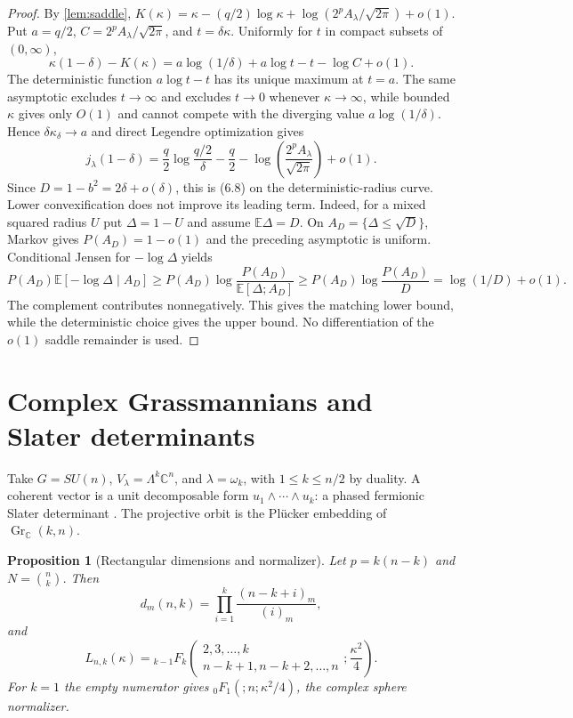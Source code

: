 \documentclass[11pt,a4paper]{article}
\newtheorem{proposition}[theorem]{Proposition}
\newcommand{\E}{\mathbb E}
\newcommand{\C}{\mathbb C}
\DeclareMathOperator{\Gr}{Gr}
\begin{document}
\begin{proof}
By \cref{lem:saddle},
$K(\kappa)=\kappa-(q/2)\log\kappa+
\log(2^pA_\lambda/\sqrt{2\pi})+o(1)$.
Put $a=q/2$, $C=2^pA_\lambda/\sqrt{2\pi}$, and
$t=\delta\kappa$.  Uniformly for $t$ in compact subsets of
$(0,\infty)$,
\[
 \kappa(1-\delta)-K(\kappa)
 =a\log(1/\delta)+a\log t-t-\log C+o(1).
\]
The deterministic function $a\log t-t$ has its unique maximum at $t=a$.
The same asymptotic excludes $t\to\infty$ and excludes $t\to0$ whenever
$\kappa\to\infty$, while bounded $\kappa$ gives only $O(1)$ and cannot
compete with the diverging value $a\log(1/\delta)$.  Hence
$\delta\kappa_\delta\to a$ and direct Legendre optimization gives
\[
 j_\lambda(1-\delta)=
 \frac q2\log\frac{q/2}{\delta}-\frac q2
 -\log\left(\frac{2^pA_\lambda}{\sqrt{2\pi}}\right)+o(1).
\]
Since $D=1-b^2=2\delta+o(\delta)$, this is (6.8) on the
deterministic-radius curve.  Lower convexification does not improve its
leading term.  Indeed, for a mixed squared radius $U$ put
$\Delta=1-U$ and assume $\E\Delta=D$.  On
$A_D=\{\Delta\le\sqrt D\}$, Markov gives
$P(A_D)=1-o(1)$ and the preceding asymptotic is uniform.  Conditional
Jensen for $-\log\Delta$ yields
\[
 P(A_D)\E[-\log\Delta\mid A_D]
 \ge P(A_D)\log\frac{P(A_D)}{\E[\Delta;A_D]}
 \ge P(A_D)\log\frac{P(A_D)}D
 =\log(1/D)+o(1).
\]
The complement contributes nonnegatively.  This gives the matching lower
bound, while the deterministic choice gives the upper bound.  No
differentiation of the $o(1)$ saddle remainder is used.
\end{proof}

\section{Complex Grassmannians and Slater determinants}

Take $G=SU(n)$, $V_\lambda=\Lambda^k\C^n$, and
$\lambda=\omega_k$, with $1\le k\le n/2$ by duality.  A coherent vector is
a unit decomposable form $u_1\wedge\cdots\wedge u_k$: a phased fermionic
Slater determinant \cite{Lowdin1955}.  The projective orbit is the Pl\"ucker
embedding of $\Gr_\C(k,n)$.

\begin{proposition}[Rectangular dimensions and normalizer]\label{prop:slater}
Let $p=k(n-k)$ and $N=\binom nk$.  Then
\[
 d_m(n,k)=\prod_{i=1}^k\frac{(n-k+i)_m}{(i)_m},
 \tag{7.1}
\]
and
\[
 \boxed{
 L_{n,k}(\kappa)=
 {}_{k-1}F_k\!\left(
 \begin{matrix}2,3,\ldots,k\\n-k+1,n-k+2,\ldots,n\end{matrix};
 \frac{\kappa^2}{4}\right).}
 \tag{7.2}
\]
For $k=1$ the empty numerator gives ${}_0F_1(;n;\kappa^2/4)$, the complex
sphere normalizer.
\end{proposition}
\end{document}
